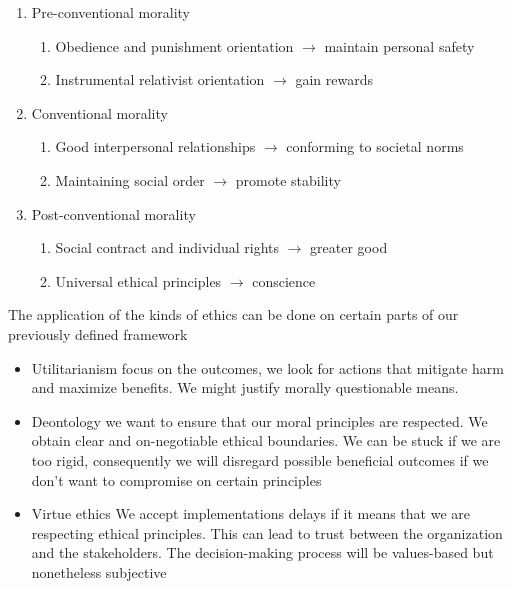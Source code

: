 \begin{enumerate}[label=\textbf{Level \Roman*}:]
    \item Pre-conventional morality
    \begin{enumerate}[label=\arabic*.]
        \item Obedience and punishment orientation $\rightarrow$ maintain personal safety
        \item Instrumental relativist orientation $\rightarrow$ gain rewards
    \end{enumerate}
    
    \item Conventional morality 
    \begin{enumerate}[label=\arabic*., resume] 
        \item Good interpersonal relationships $\rightarrow$ conforming to societal norms
        \item Maintaining social order $\rightarrow$ promote stability
    \end{enumerate}
    
    \item Post-conventional morality
    \begin{enumerate}[label=\arabic*., resume]
        \item Social contract and individual rights $\rightarrow$ greater good
        \item Universal ethical principles $\rightarrow$ conscience
    \end{enumerate}
\end{enumerate}

The application of the kinds of ethics can be done on certain parts of our previously defined framework

\begin{itemize}
    \item Utilitarianism \ra focus on the outcomes, we look for actions that mitigate harm and maximize benefits. We might justify morally questionable means.
    \item Deontology \ra we want to ensure that our moral principles are respected. We obtain clear and on-negotiable ethical boundaries. We can be stuck if we are too rigid, consequently we will disregard possible beneficial outcomes if we don't want to compromise on certain principles
    \item Virtue ethics \ra We accept implementations delays if it means that we are respecting ethical principles. This can lead to trust between the organization and the stakeholders. The decision-making process will be values-based but nonetheless subjective
\end{itemize}

